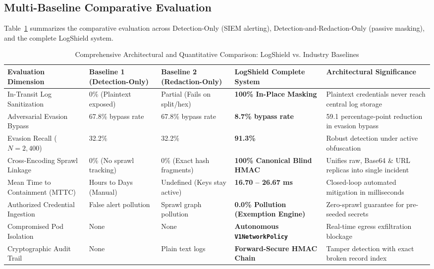 \documentclass[conference]{IEEEtran}
\begin{document}
\subsection{Multi-Baseline Comparative Evaluation}\label{sec:baseline_comparison}
Table~\ref{tab:baseline_comparison} summarizes the comparative evaluation across Detection-Only (SIEM alerting), Detection-and-Redaction-Only (passive masking), and the complete LogShield system.

\begin{table}[t]
\caption{Comprehensive Architectural and Quantitative Comparison: LogShield vs. Industry Baselines}
\label{tab:baseline_comparison}
\centering
\footnotesize
\setlength{\tabcolsep}{3.5pt}
\begin{tabularx}{\textwidth}{p{3.2cm}XXXp{3.6cm}}
\toprule
\textbf{Evaluation Dimension} & \textbf{Baseline 1 (Detection-Only)} & \textbf{Baseline 2 (Redaction-Only)} & \textbf{LogShield Complete System} & \textbf{Architectural Significance} \\
\midrule
In-Transit Log Sanitization & 0\% (Plaintext exposed) & Partial (Fails on split/hex) & \textbf{100\% In-Place Masking} & Plaintext credentials never reach central log storage \\
Adversarial Evasion Bypass & 67.8\% bypass rate & 67.8\% bypass rate & \textbf{8.7\% bypass rate} & 59.1 percentage-point reduction in evasion bypass \\
Evasion Recall ($N=2,400$) & 32.2\% & 32.2\% & \textbf{91.3\%} & Robust detection under active obfuscation \\
Cross-Encoding Sprawl Linkage & 0\% (No sprawl tracking) & 0\% (Exact hash fragments) & \textbf{100\% Canonical Blind HMAC} & Unifies raw, Base64 \& URL replicas into single incident \\
Mean Time to Containment (MTTC) & Hours to Days (Manual) & Undefined (Keys stay active) & \textbf{16.70 -- 26.67 ms} & Closed-loop automated mitigation in milliseconds \\
Authorized Credential Ingestion & False alert pollution & Sprawl graph pollution & \textbf{0.0\% Pollution (Exemption Engine)} & Zero-sprawl guarantee for pre-seeded secrets \\
Compromised Pod Isolation & None & None & \textbf{Autonomous \texttt{V1NetworkPolicy}} & Real-time egress exfiltration blockage \\
Cryptographic Audit Trail & None & Plain text logs & \textbf{Forward-Secure HMAC Chain} & Tamper detection with exact broken record index \\
\bottomrule
\end{tabularx}
\end{table}
\end{document}
